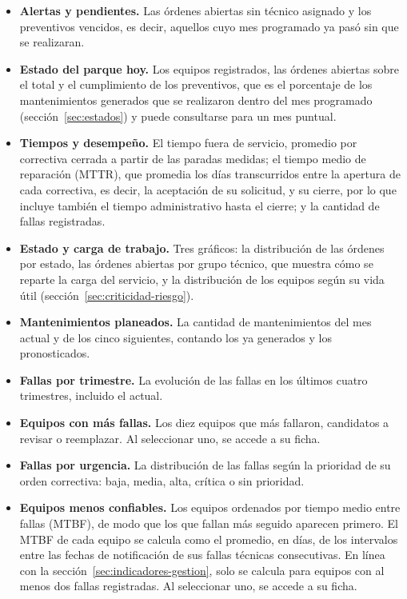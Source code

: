 \documentclass[10pt]{article}
\begin{document}
\begin{itemize}
    \item \textbf{Alertas y pendientes.} Las órdenes abiertas sin técnico asignado y los preventivos vencidos, es decir, aquellos cuyo mes programado ya pasó sin que se realizaran.
    \item \textbf{Estado del parque hoy.} Los equipos registrados, las órdenes abiertas sobre el total y el cumplimiento de los preventivos, que es el porcentaje de los mantenimientos generados que se realizaron dentro del mes programado (sección~\ref{sec:estados}) y puede consultarse para un mes puntual.
    \item \textbf{Tiempos y desempeño.} El tiempo fuera de servicio, promedio por correctiva cerrada a partir de las paradas medidas; el tiempo medio de reparación (MTTR), que promedia los días transcurridos entre la apertura de cada correctiva, es decir, la aceptación de su solicitud, y su cierre, por lo que incluye también el tiempo administrativo hasta el cierre; y la cantidad de fallas registradas.
    \item \textbf{Estado y carga de trabajo.} Tres gráficos: la distribución de las órdenes por estado, las órdenes abiertas por grupo técnico, que muestra cómo se reparte la carga del servicio, y la distribución de los equipos según su vida útil (sección~\ref{sec:criticidad-riesgo}).
    \item \textbf{Mantenimientos planeados.} La cantidad de mantenimientos del mes actual y de los cinco siguientes, contando los ya generados y los pronosticados.
    \item \textbf{Fallas por trimestre.} La evolución de las fallas en los últimos cuatro trimestres, incluido el actual.
    \item \textbf{Equipos con más fallas.} Los diez equipos que más fallaron, candidatos a revisar o reemplazar. Al seleccionar uno, se accede a su ficha.
    \item \textbf{Fallas por urgencia.} La distribución de las fallas según la prioridad de su orden correctiva: baja, media, alta, crítica o sin prioridad.
    \item \textbf{Equipos menos confiables.} Los equipos ordenados por tiempo medio entre fallas (MTBF), de modo que los que fallan más seguido aparecen primero. El MTBF de cada equipo se calcula como el promedio, en días, de los intervalos entre las fechas de notificación de sus fallas técnicas consecutivas. En línea con la sección~\ref{sec:indicadores-gestion}, solo se calcula para equipos con al menos dos fallas registradas. Al seleccionar uno, se accede a su ficha.
\end{itemize}
\end{document}
